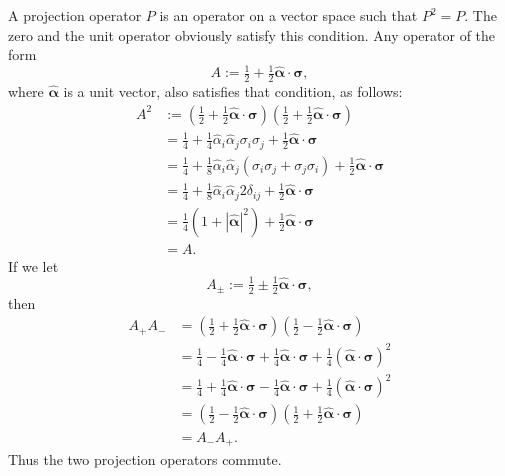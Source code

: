 \documentclass[12pt]{article}
\begin{document}
A projection operator $P$ is an operator on a vector space such that
$P^2 = P$. The zero and the unit operator obviously satisfy this
condition.  Any operator of the form
\begin{displaymath}
  A:= \tfrac{1}{2} + \tfrac{1}{2} \hat{\bm{\alpha}} \cdot \bm{\sigma},
\end{displaymath}
where $\hat{\bm{\alpha}}$ is a unit vector, also satisfies that condition, as follows:
\begin{align*}
  A^2
  &:= \left( \tfrac{1}{2} + \tfrac{1}{2} \hat{\bm{\alpha}} \cdot \bm{\sigma} \right)
  \left( \tfrac{1}{2} + \tfrac{1}{2} \hat{\bm{\alpha}} \cdot \bm{\sigma} \right) \\
  &= \tfrac{1}{4} + \tfrac{1}{4} \hat{\alpha}_i \hat{\alpha}_j \sigma_i \sigma_j + \tfrac{1}{2} \hat{\bm{\alpha}} \cdot \bm{\sigma} \\
  &= \tfrac{1}{4} + \tfrac{1}{8} \hat{\alpha}_i \hat{\alpha}_j ( \sigma_i \sigma_j + \sigma_j \sigma_i ) + \tfrac{1}{2} \hat{\bm{\alpha}} \cdot \bm{\sigma} \\
  &= \tfrac{1}{4} + \tfrac{1}{8} \hat{\alpha}_i \hat{\alpha}_j 2 \delta_{ij} + \tfrac{1}{2} \hat{\bm{\alpha}} \cdot \bm{\sigma} \\
  &= \tfrac{1}{4} ( 1 + |\hat{\bm{\alpha}}|^2 ) + \tfrac{1}{2} \hat{\bm{\alpha}} \cdot \bm{\sigma} \\
  &= A.
\end{align*}
If we let
\begin{displaymath}
  A_{\pm} := \tfrac{1}{2} \pm \tfrac{1}{2} \hat{\bm{\alpha}} \cdot \bm{\sigma},
\end{displaymath}
then
\begin{displaymath}
  \begin{split}
    A_{+} A_{-}
    &= \left( \tfrac{1}{2} + \tfrac{1}{2} \hat{\bm{\alpha}} \cdot \bm{\sigma} \right)
    \left( \tfrac{1}{2} - \tfrac{1}{2} \hat{\bm{\alpha}} \cdot \bm{\sigma} \right) \\
    &= \tfrac{1}{4} - \tfrac{1}{4} \hat{\bm{\alpha}} \cdot \bm{\sigma} + \tfrac{1}{4} \hat{\bm{\alpha}} \cdot \bm{\sigma} + \tfrac{1}{4} (\hat{\bm{\alpha}} \cdot \bm{\sigma})^2 \\
    &= \tfrac{1}{4} + \tfrac{1}{4} \hat{\bm{\alpha}} \cdot \bm{\sigma} - \tfrac{1}{4} \hat{\bm{\alpha}} \cdot \bm{\sigma} + \tfrac{1}{4} (\hat{\bm{\alpha}} \cdot \bm{\sigma})^2 \\
    &= \left( \tfrac{1}{2} - \tfrac{1}{2} \hat{\bm{\alpha}} \cdot \bm{\sigma} \right)
    \left( \tfrac{1}{2} + \tfrac{1}{2} \hat{\bm{\alpha}} \cdot \bm{\sigma} \right) \\
    &= A_{-} A_{+}.
  \end{split}
\end{displaymath}
Thus the two projection operators commute.
\end{document}
